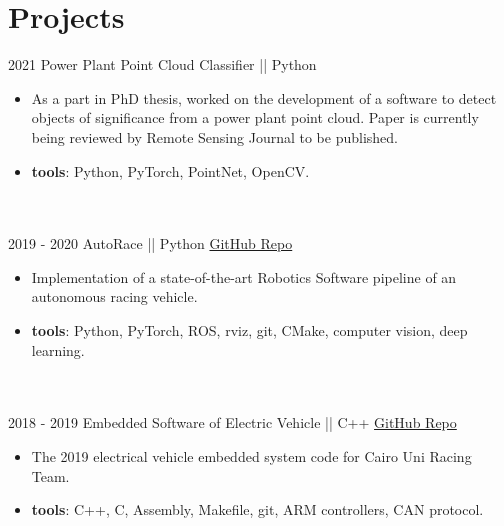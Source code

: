 \documentclass[a4paper]{twentysecondcv} %
\begin{document}
\section{Projects }{\faClipboard}
\begin{twenty}
  \twentyitem
  {2021}
  {}
   {Power Plant Point Cloud Classifier || Python}
   {\href{}{}}
   {}
   {\vspace{-2mm}\begin{itemize}[topsep=0pt,partopsep=0pt]
   \item  As a part in PhD thesis, worked on the development of a software to detect objects of significance from a power plant point cloud. Paper is currently being reviewed by Remote Sensing Journal to be published.
   \item \textbf{tools}: Python, PyTorch, PointNet, OpenCV.
  \end{itemize}} \\\\


 \twentyitem
 {2019 - 2020}
{}
  {AutoRace || Python} 
  {\href{https://github.com/curtfs/CURT-FSAI/}{GitHub Repo}}
  {}
  {\vspace{-2mm}\begin{itemize}[topsep=0pt,partopsep=0pt]
  \item  Implementation of a state-of-the-art Robotics Software pipeline of an autonomous racing vehicle.
  \item \textbf{tools}: Python, PyTorch, ROS, rviz, git, CMake, computer vision, deep learning.
 
\end{itemize}} \\\\

\twentyitem
{2018 - 2019}
{}
{Embedded Software of Electric Vehicle || C++}
{\href{https://github.com/curtfs/CURTEV-19//}{GitHub Repo}}
{}
{\vspace{-2mm}\begin{itemize}[topsep=0pt,partopsep=0pt]
\item  The 2019 electrical vehicle embedded system code for Cairo Uni Racing Team.
\item \textbf{tools}: C++, C, Assembly, Makefile, git, ARM controllers, CAN protocol.
\end{itemize}} \\\\




      
  \end{twenty}
\end{document}
